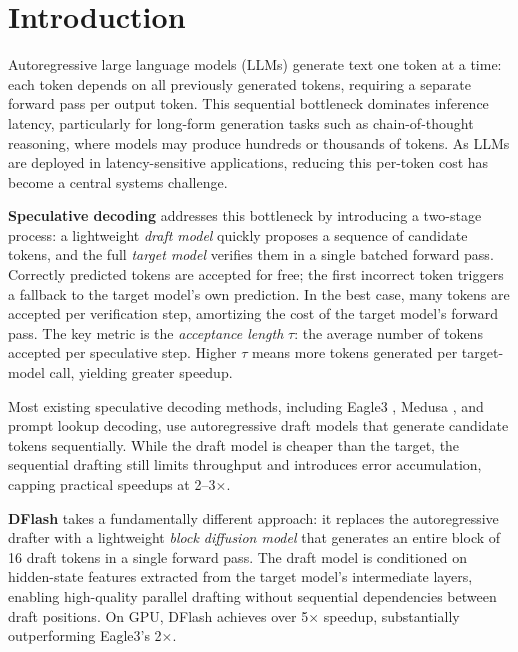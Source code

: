 \documentclass[12pt,letterpaper]{article}
\begin{document}
\section{Introduction}

Autoregressive large language models (LLMs) generate text one token at a time: each token depends on all previously generated tokens, requiring a separate forward pass per output token. This sequential bottleneck dominates inference latency, particularly for long-form generation tasks such as chain-of-thought reasoning, where models may produce hundreds or thousands of tokens. As LLMs are deployed in latency-sensitive applications, reducing this per-token cost has become a central systems challenge.

\textbf{Speculative decoding} \citep{leviathan2023fastinferencetransformersspeculative} addresses this bottleneck by introducing a two-stage process: a lightweight \emph{draft model} quickly proposes a sequence of candidate tokens, and the full \emph{target model} verifies them in a single batched forward pass. Correctly predicted tokens are accepted for free; the first incorrect token triggers a fallback to the target model's own prediction. In the best case, many tokens are accepted per verification step, amortizing the cost of the target model's forward pass. The key metric is the \emph{acceptance length} $\tau$: the average number of tokens accepted per speculative step. Higher $\tau$ means more tokens generated per target-model call, yielding greater speedup.

Most existing speculative decoding methods, including Eagle3 \citep{li2025eagle3scalinginferenceacceleration}, Medusa \citep{cai2024medusasimplellminference}, and prompt lookup decoding, use autoregressive draft models that generate candidate tokens sequentially. While the draft model is cheaper than the target, the sequential drafting still limits throughput and introduces error accumulation, capping practical speedups at 2--3$\times$.

\textbf{DFlash} \citep{chen2026dflashblockdiffusionflash} takes a fundamentally different approach: it replaces the autoregressive drafter with a lightweight \emph{block diffusion model} that generates an entire block of 16 draft tokens in a single forward pass. The draft model is conditioned on hidden-state features extracted from the target model's intermediate layers, enabling high-quality parallel drafting without sequential dependencies between draft positions. On GPU, DFlash achieves over 5$\times$ speedup, substantially outperforming Eagle3's 2$\times$.
\end{document}
